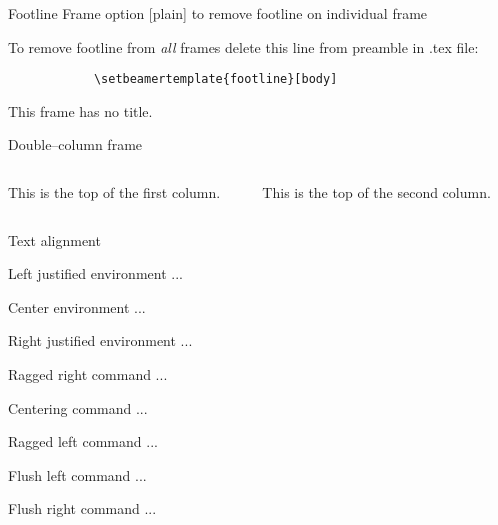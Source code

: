 \documentclass[11pt,t]{beamer}
\begin{document}
	\begin{frame}{Footline}   %
		\vspace{2.1mm} %
		Frame option [plain] to remove footline on individual frame

		\vspace{25pt}
		To remove footline from \emph{all} frames delete this line from preamble in .tex file:
		\begin{verbatim}
			\setbeamertemplate{footline}[body]
		\end{verbatim}
	\end{frame}




	\begin{frame}
		This frame has no title.
	\end{frame}




	\begin{frame}{Double--column frame}
		\begin{columns}[t]
			\begin{column}{.5\textwidth}
				This is the top of the first column.
			\end{column}
			\begin{column}{.5\textwidth}
				This is the top of the second column.
			\end{column}
		\end{columns}
	\end{frame}




	\begin{frame}{Text alignment}
		\begin{flushleft}
			Left justified 	environment ...
		\end{flushleft}
		\begin{center}
			Center environment ...
		\end{center}
		\begin{flushright}
			Right justified environment ...
		\end{flushright}

		\vspace{6pt}
		\raggedright Ragged right command ...

		\centering	Centering command ...

		\raggedleft Ragged left command ...

		\vspace{6pt}
		\flushleft Flush left command ...

		\flushright Flush right command ...
	\end{frame}
\end{document}
